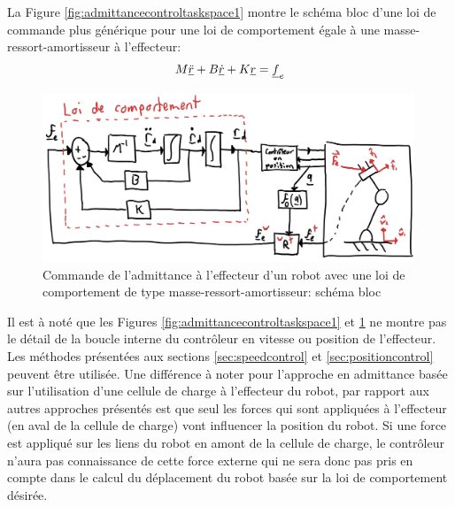 La Figure \ref{fig:admittancecontroltaskspace1} montre le schéma bloc d'une loi de commande plus générique pour une loi de comportement égale à une masse-ressort-amortisseur à l'effecteur:
\begin{align}
M \underline{\ddot{r}} + B \underline{\dot{r}} + K \underline{r}= \underline{f}_e
\end{align}
\begin{figure}[h]
	\centering
		\includegraphics[width=0.99\textwidth]{fig/admittancecontroltaskspace.jpg}
	\caption{Commande de l'admittance à l'effecteur d'un robot avec une loi de comportement de type masse-ressort-amortisseur: schéma bloc}
	\label{fig:admittancecontroltaskspace}
\end{figure}
Il est à noté que les Figures \ref{fig:admittancecontroltaskspace1} et \ref{fig:admittancecontroltaskspace} ne montre pas le détail de la boucle interne du contrôleur en vitesse ou position de l'effecteur. Les méthodes présentées aux sections \ref{sec:speedcontrol} et \ref{sec:positioncontrol} peuvent être utilisée. Une différence à noter pour l'approche en admittance basée sur l'utilisation d'une cellule de charge à l'effecteur du robot, par rapport aux autres approches présentés est que seul les forces qui sont appliquées à l'effecteur (en aval de la cellule de charge) vont influencer la position du robot. Si une force est appliqué sur les liens du robot en amont de la cellule de charge, le contrôleur n'aura pas connaissance de cette force externe qui ne sera donc pas pris en compte dans le calcul du déplacement du robot basée sur la loi de comportement désirée.



